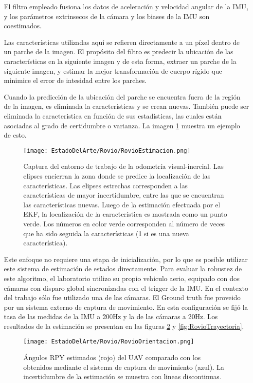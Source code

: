 El filtro empleado fusiona los datos de aceleración y velocidad angular de la IMU, y los parámetros extrinsecos de la cámara y los biases de la IMU son coestimados. 

Las características utilizadas aquí se refieren directamente a un píxel dentro de un parche de la imagen. El propósito del filtro es predecir la ubicación de las características en la siguiente imagen y de esta forma, extraer un parche de la siguiente imagen, y estimar la mejor transformación de cuerpo rígido que minimice el error de intesidad entre los parches. 

Cuando la predicción de la ubicación del parche se encuentra fuera de la región de la imagen, es eliminada la características y se crean nuevas. También puede ser eliminada la caracteristica en función de sus estadísticas, las cuales están asociadas al grado de certidumbre o varianza. La imagen \ref{fig:RovioEstimacion} muestra un ejemplo de esto.

\begin{figure}[H]
	\centering
	\texttt{[image: EstadoDelArte/Rovio/RovioEstimacion.png]}
	\caption[Captura del entorno de trabajo de la odometría visual-inercial]{Captura del entorno de trabajo de la odometría visual-inercial. Las elipses encierran la zona donde se predice la localización de las características. Las elipses estrechas corresponden a las características de mayor incertidumbre, entre las que se encuentran las características nuevas. Luego de la estimación efectuada por el EKF, la localización de la característica es mostrada como un punto verde. Los números en color verde corresponden al número de veces que ha sido seguida la características (1 si es una nueva característica).}
	\label{fig:RovioEstimacion}
\end{figure}


Este enfoque no requiere una etapa de inicialización, por lo que es posible utilizar este sistema de estimación de estados directamente. Para evaluar la robustez de este algoritmo, el laboratorio utilizo su propio vehiculo aerio, equipado con dos cámaras con disparo global sincronizadas con el trigger de la IMU. En el contexto del trabajo sólo fue utilizado una de las cámaras. El Ground truth fue proveido por un sistema externo de captura de movimiento. En esta configuración se fijó la tasa de las medidas de la IMU a 200Hz y la de las cámaras a 20Hz. Los resultados de la estimación se presentan en las figuras \ref{fig:RovioOrientacion} y  \ref{fig:RovioTrayectoria}.

\begin{figure}[H]
	\centering
	\texttt{[image: EstadoDelArte/Rovio/RovioOrientacion.png]}
	\caption[Ángulos RPY estimados utilizando ROVIO]{Ángulos RPY estimados (rojo) del UAV comparado con los obtenidos mediante el sistema de captura de movimiento (azul). La incertidumbre de la estimación se muestra con lineas discontinuas. }
	\label{fig:RovioOrientacion}
\end{figure}


